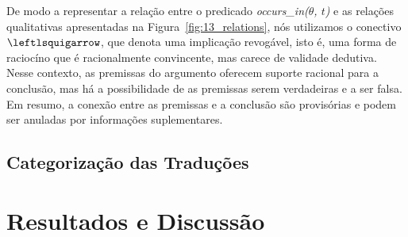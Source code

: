 \documentclass[a4paper, twocolumn, 11pt, twoside]{article}
\begin{document}
De modo a representar a relação entre o predicado \textit{occurs\_in($\theta$, $t$)} e as relações qualitativas 
apresentadas na Figura~\ref{fig:13_relations}, nós utilizamos o conectivo $\leftlsquigarrow$, que denota uma implicação
revogável, isto é, uma forma de raciocíno que é racionalmente convincente, mas carece de validade dedutiva. 
Nesse contexto, as premissas do argumento oferecem suporte racional para a conclusão, mas há a possibilidade 
de as premissas serem verdadeiras e a ser falsa. Em resumo, a conexão entre as premissas e a conclusão são provisórias
e podem ser anuladas por informações suplementares.

\subsection{Categorização das Traduções}

\section{Resultados e Discussão}
\end{document}
